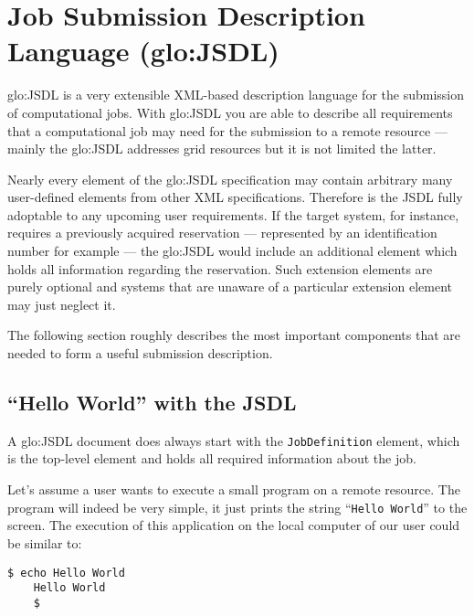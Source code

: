 \section[Job Submission Description Language]
{Job Submission Description Language (\gls{glo:JSDL})}

\gls{glo:JSDL} is a very extensible XML-based description language for the
submission  of computational jobs.   With \gls{glo:JSDL}  you are  able to
describe  all requirements  that  a  computational job  may  need for  the
submission to  a remote resource  --- mainly the  \gls{glo:JSDL} addresses
grid resources but it is not limited the latter.

Nearly  every  element of  the  \gls{glo:JSDL}  specification may  contain
arbitrary  many  user-defined  elements  from  other  XML  specifications.
Therefore is the  JSDL fully adoptable to any  upcoming user requirements.
If  the  target  system,  for  instance, requires  a  previously  acquired
reservation ---  represented by an  identification number for  example ---
the  \gls{glo:JSDL} would include  an additional  element which  holds all
information regarding the reservation.  Such extension elements are purely
optional and  systems that are  unaware of a particular  extension element
may just neglect it.

The following section roughly describes the most important components that
are needed to form a useful submission description.

\subsection{``Hello World'' with the JSDL}

A    \gls{glo:JSDL}    document     does    always    start    with    the
\texttt{JobDefinition} element,  which is the top-level  element and holds
all required information about the job.

Let's assume a user wants to execute a small program on a remote resource.
The  program  will  indeed be  very  simple,  it  just prints  the  string
``\texttt{Hello World}'' to the  screen. The execution of this application
on the local computer of our user could be similar to:

\begin{minipage}{0.75\textwidth}
  \begin{lstlisting}[language=ksh]
    $ echo Hello World
    Hello World
    $
  \end{lstlisting}
\end{minipage}

